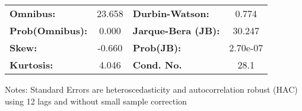 \begin{center}
\begin{tabular}{lcccccc}
\bottomrule
\end{tabular}
\begin{tabular}{lclc}
\textbf{Omnibus:}       & 23.658 & \textbf{  Durbin-Watson:     } &    0.774  \\
\textbf{Prob(Omnibus):} &  0.000 & \textbf{  Jarque-Bera (JB):  } &   30.247  \\
\textbf{Skew:}          & -0.660 & \textbf{  Prob(JB):          } & 2.70e-07  \\
\textbf{Kurtosis:}      &  4.046 & \textbf{  Cond. No.          } &     28.1  \\
\bottomrule
\end{tabular}
\end{center}

Notes: \newline
 [1] Standard Errors are heteroscedasticity and autocorrelation robust (HAC) using 12 lags and without small sample correction
